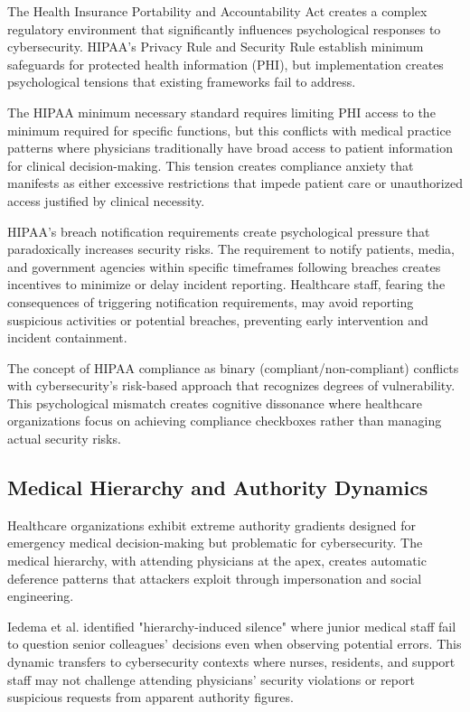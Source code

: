 \documentclass[10pt, twocolumn]{article}
\begin{document}
The Health Insurance Portability and Accountability Act creates a complex regulatory environment that significantly influences psychological responses to cybersecurity. HIPAA's Privacy Rule and Security Rule establish minimum safeguards for protected health information (PHI), but implementation creates psychological tensions that existing frameworks fail to address.

The HIPAA minimum necessary standard requires limiting PHI access to the minimum required for specific functions, but this conflicts with medical practice patterns where physicians traditionally have broad access to patient information for clinical decision-making. This tension creates compliance anxiety that manifests as either excessive restrictions that impede patient care or unauthorized access justified by clinical necessity\cite{cdc2018}.

HIPAA's breach notification requirements create psychological pressure that paradoxically increases security risks. The requirement to notify patients, media, and government agencies within specific timeframes following breaches creates incentives to minimize or delay incident reporting. Healthcare staff, fearing the consequences of triggering notification requirements, may avoid reporting suspicious activities or potential breaches, preventing early intervention and incident containment\cite{hhs2021}.

The concept of HIPAA compliance as binary (compliant/non-compliant) conflicts with cybersecurity's risk-based approach that recognizes degrees of vulnerability. This psychological mismatch creates cognitive dissonance where healthcare organizations focus on achieving compliance checkboxes rather than managing actual security risks\cite{luna2017}.

\subsection{Medical Hierarchy and Authority Dynamics}

Healthcare organizations exhibit extreme authority gradients designed for emergency medical decision-making but problematic for cybersecurity. The medical hierarchy, with attending physicians at the apex, creates automatic deference patterns that attackers exploit through impersonation and social engineering.

Iedema et al.\cite{iedema2006} identified "hierarchy-induced silence" where junior medical staff fail to question senior colleagues' decisions even when observing potential errors. This dynamic transfers to cybersecurity contexts where nurses, residents, and support staff may not challenge attending physicians' security violations or report suspicious requests from apparent authority figures.
\end{document}
